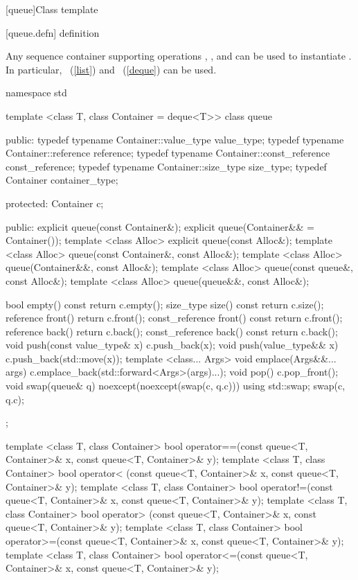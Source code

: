[queue]{Class template }

[queue.defn]{ definition}

\pnum
{}%
Any sequence container supporting operations
,
,
and
can be used to instantiate
.
In particular,
~(\ref{list})
and
~(\ref{deque})
can be used.

\begin{codeblock}
namespace std {
  template <class T, class Container = deque<T>>
  class queue {
  public:
    typedef typename Container::value_type            value_type;
    typedef typename Container::reference             reference;
    typedef typename Container::const_reference       const_reference;
    typedef typename Container::size_type             size_type;
    typedef          Container                        container_type;

  protected:
    Container c;

  public:
    explicit queue(const Container&);
    explicit queue(Container&& = Container());
    template <class Alloc> explicit queue(const Alloc&);
    template <class Alloc> queue(const Container&, const Alloc&);
    template <class Alloc> queue(Container&&, const Alloc&);
    template <class Alloc> queue(const queue&, const Alloc&);
    template <class Alloc> queue(queue&&, const Alloc&);

    bool              empty() const     { return c.empty(); }
    size_type         size()  const     { return c.size(); }
    reference         front()           { return c.front(); }
    const_reference   front() const     { return c.front(); }
    reference         back()            { return c.back(); }
    const_reference   back() const      { return c.back(); }
    void push(const value_type& x)      { c.push_back(x); }
    void push(value_type&& x)           { c.push_back(std::move(x)); }
    template <class... Args>
      void emplace(Args&&... args)      { c.emplace_back(std::forward<Args>(args)...); }
    void pop()                          { c.pop_front(); }
    void swap(queue& q) noexcept(noexcept(swap(c, q.c)))
      { using std::swap; swap(c, q.c); }
  };

  template <class T, class Container>
    bool operator==(const queue<T, Container>& x, const queue<T, Container>& y);
  template <class T, class Container>
    bool operator< (const queue<T, Container>& x, const queue<T, Container>& y);
  template <class T, class Container>
    bool operator!=(const queue<T, Container>& x, const queue<T, Container>& y);
  template <class T, class Container>
    bool operator> (const queue<T, Container>& x, const queue<T, Container>& y);
  template <class T, class Container>
    bool operator>=(const queue<T, Container>& x, const queue<T, Container>& y);
  template <class T, class Container>
    bool operator<=(const queue<T, Container>& x, const queue<T, Container>& y);

}
\end{codeblock}
